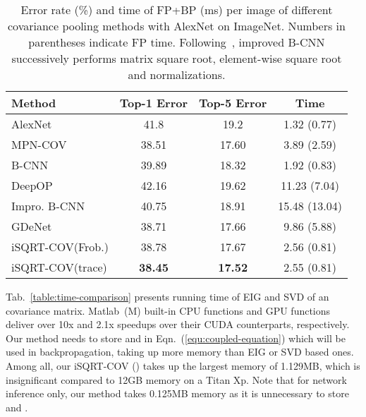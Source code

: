 \documentclass[10pt,twocolumn,letterpaper]{article}
\begin{document}
\begin{table}[t]
\setlength\tabcolsep{4pt}
	\renewcommand{\baselinestretch}{1.05}
\footnotesize
	\centering
\begin{minipage}[t]{1.0\linewidth}
		\centering
		\begin{tabular}{|l|c|c|c|}
			\hline
			Method & Top-1 Error   &  Top-5 Error  & Time \\
			\hline
			\hline
			AlexNet~\cite{Krizhevsky2012ImageNet}       &  41.8     & 19.2  &  1.32 (0.77) \\
			\hline
			MPN-COV~\cite{Li_2017_ICCV}                           &  38.51 & 17.60 & 3.89 (2.59)\\
			B-CNN~\cite{lin2015bilinear}          &  39.89 & 18.32 & 1.92 (0.83)\\
			DeepOP~\cite{Ionescu_2015_ICCV} &  42.16 & 19.62  & 11.23 (7.04)\\
			Impro. B-CNN\cite{lin2017improved}     & 40.75         &  18.91  &  15.48 (13.04)  \\
			GDeNet~\cite{Wang_2017_CVPR}      &    38.71      & 17.66     &  9.86 (5.88) \\
			\hline
			\hline
			iSQRT-COV(Frob.)   &  38.78 &  17.67  & 2.56 (0.81)\\
			iSQRT-COV(trace) &  \textbf{38.45} &  \textbf{17.52} & 2.55 (0.81) \\
			\hline
		\end{tabular}
	\end{minipage}
	\renewcommand{\baselinestretch}{1.0}
	\caption{Error rate (\%) and time of FP+BP (ms) per image of different covariance pooling methods with AlexNet on ImageNet. Numbers in parentheses indicate FP time.  Following~\cite{lin2017improved}, improved B-CNN  successively  performs matrix square root, element-wise square root and  normalizations.}
	\label{table:second-order-AlexNet}
\end{table}
Tab.~\ref{table:time-comparison}
presents  running time  of EIG and SVD of an  covariance matrix.   Matlab~(M) built-in CPU functions and GPU functions deliver over 10x and 2.1x  speedups over their CUDA counterparts, respectively.  Our method needs to store  and  in Eqn.~(\ref{equ:coupled-equation}) which will be used in backpropagation, taking up more memory than EIG or SVD based ones. Among all,  our iSQRT-COV () takes up the largest memory of 1.129MB, which is insignificant compared to 12GB memory on a Titan Xp. Note that for network inference only, our method  takes  0.125MB memory as it is unnecessary to store   and .
\end{document}
